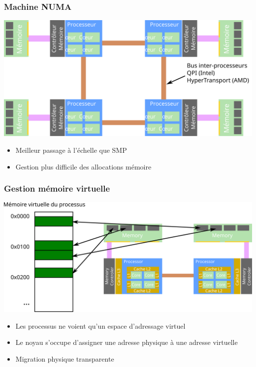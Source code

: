 \documentclass{beamer}
\begin{document}
\begin{frame}
  \frametitle{Machine NUMA}
  \centerline{\includegraphics[width=0.8\linewidth]{numa}}

  \begin{itemize}
    \item Meilleur passage à l'échelle que SMP
    \item Gestion plus difficile des allocations mémoire
  \end{itemize}

\end{frame}

\begin{frame}
  \frametitle{Gestion mémoire virtuelle}
  \centerline{\includegraphics[width=0.8\linewidth]{virtual}}

  \begin{itemize}
    \item Les processus ne voient qu'un espace d'adressage virtuel
    \item Le noyau s'occupe d'assigner une adresse physique à une adresse virtuelle
    \item Migration physique transparente
  \end{itemize}
\end{frame}
\end{document}
